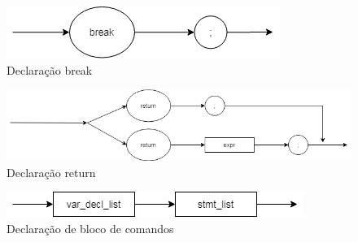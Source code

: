 \documentclass[]{article}
\numberwithin{equation}{section}
\begin{document}
\begin{center}
\begin{figure}[h!]
  \includegraphics[width=\linewidth]{./assets/break_stmt.png}
  \caption{Declaração break}
\end{figure}
\end{center}

\begin{center}
\begin{figure}[h!]
  \includegraphics[width=\linewidth]{./assets/return_stmt.png}
  \caption{Declaração return}
\end{figure}
\end{center}

\begin{center}
\begin{figure}[h!]
  \includegraphics[width=\linewidth]{./assets/decl_block.png}
  \caption{Declaração de bloco de comandos}
\end{figure}
\end{center}
\end{document}
